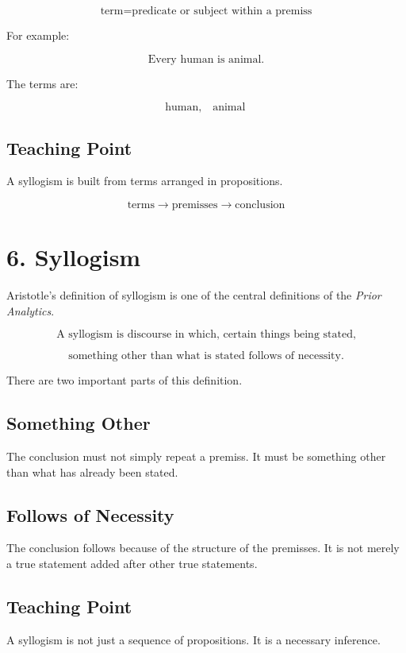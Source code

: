 \documentclass[12pt]{article}
\begin{document}
\[
\boxed{
\text{term} = \text{predicate or subject within a premiss}
}
\]

For example:

\[
\text{Every human is animal.}
\]

The terms are:

\[
\text{human}, \quad \text{animal}
\]

\subsection*{Teaching Point}

A syllogism is built from terms arranged in propositions.

\[
\text{terms} \rightarrow \text{premisses} \rightarrow \text{conclusion}
\]

\section*{6. Syllogism}

Aristotle's definition of syllogism is one of the central definitions of the
\textit{Prior Analytics}.

\[
\boxed{
\text{A syllogism is discourse in which, certain things being stated,}
}
\]

\[
\boxed{
\text{something other than what is stated follows of necessity.}
}
\]

There are two important parts of this definition.

\subsection*{Something Other}

The conclusion must not simply repeat a premiss. It must be something other
than what has already been stated.

\subsection*{Follows of Necessity}

The conclusion follows because of the structure of the premisses. It is not
merely a true statement added after other true statements.

\subsection*{Teaching Point}

A syllogism is not just a sequence of propositions. It is a necessary inference.
\end{document}
